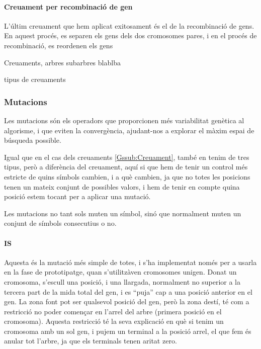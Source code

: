 \documentclass[titlepage,a4paper,12pt]{book}
\begin{document}
\paragraph{Creuament per recombinació de gen} %
\label{par:Creuament per recombinacio de gen}

L'últim creuament que hem aplicat exitosament és el de la recombinació de gens.
En aquest procés, es separen els gens dels dos cromosomes pares, i en el procés
de recombinació, es reordenen els gens

Creuaments, arbres subarbres blablba

tipus de creuaments

\subsubsection{Mutacions} %
\label{Gssub:Mutacions}

Les mutacions són els operadors que proporcionen més variabilitat genètica al
algorisme, i que eviten la convergència, ajudant-nos a explorar el màxim espai
de búsqueda possible.

Igual que en el cas dels creuaments \ref{Gssub:Creuament}, també en tenim de
tres tipus, però a diferència del creuament, aquí si que hem de tenir un control
més estricte de quins símbols cambien, i a què cambien, ja que no totes les
posicions tenen un mateix conjunt de possibles valors, i hem de tenir en compte
quina posició estem tocant per a aplicar una mutació.

Les mutacions no tant sols muten un símbol, sinó que normalment muten un
conjunt de símbols consecutius o no.

\paragraph{IS} %
\label{par:IS}
Aquesta és la mutació més simple de totes, i s'ha implementat només per a
usarla en la fase de prototipatge, quan s'utilitzàven cromosomes unigen.  Donat
un cromosoma, s'escull una posició, i una llargada, normalment no superior a la
tercera part de la mida total del gen, i es ``puja'' cap a una posició anterior
en el gen.  La zona font pot ser qualsevol posició del gen, però la zona destí,
té com a restricció no poder començar en l'arrel del arbre (primera posició en
el cromosoma).  Aquesta restricció té la seva explicació en què si tenim un
cromosoma amb un sol gen, i pujem un terminal a la posició arrel, el que fem és
anular tot l'arbre, ja que els terminals tenen aritat zero.
\end{document}
